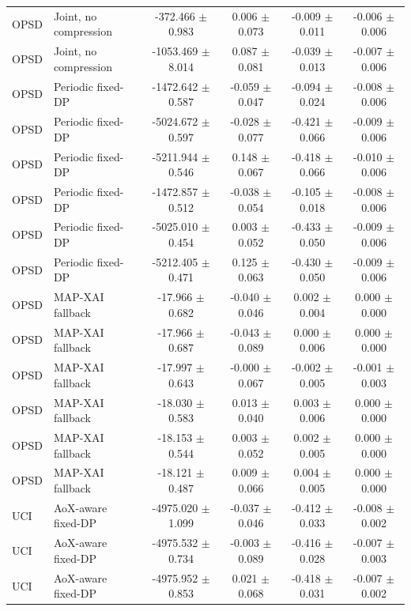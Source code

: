 \begin{tabular}{llcccc}
OPSD & Joint, no compression & -372.466 $\pm$ 0.983 & 0.006 $\pm$ 0.073 & -0.009 $\pm$ 0.011 & -0.006 $\pm$ 0.006 \\
OPSD & Joint, no compression & -1053.469 $\pm$ 8.014 & 0.087 $\pm$ 0.081 & -0.039 $\pm$ 0.013 & -0.007 $\pm$ 0.006 \\
OPSD & Periodic fixed-DP & -1472.642 $\pm$ 0.587 & -0.059 $\pm$ 0.047 & -0.094 $\pm$ 0.024 & -0.008 $\pm$ 0.006 \\
OPSD & Periodic fixed-DP & -5024.672 $\pm$ 0.597 & -0.028 $\pm$ 0.077 & -0.421 $\pm$ 0.066 & -0.009 $\pm$ 0.006 \\
OPSD & Periodic fixed-DP & -5211.944 $\pm$ 0.546 & 0.148 $\pm$ 0.067 & -0.418 $\pm$ 0.066 & -0.010 $\pm$ 0.006 \\
OPSD & Periodic fixed-DP & -1472.857 $\pm$ 0.512 & -0.038 $\pm$ 0.054 & -0.105 $\pm$ 0.018 & -0.008 $\pm$ 0.006 \\
OPSD & Periodic fixed-DP & -5025.010 $\pm$ 0.454 & 0.003 $\pm$ 0.052 & -0.433 $\pm$ 0.050 & -0.009 $\pm$ 0.006 \\
OPSD & Periodic fixed-DP & -5212.405 $\pm$ 0.471 & 0.125 $\pm$ 0.063 & -0.430 $\pm$ 0.050 & -0.009 $\pm$ 0.006 \\
OPSD & MAP-XAI fallback & -17.966 $\pm$ 0.682 & -0.040 $\pm$ 0.046 & 0.002 $\pm$ 0.004 & 0.000 $\pm$ 0.000 \\
OPSD & MAP-XAI fallback & -17.966 $\pm$ 0.687 & -0.043 $\pm$ 0.089 & 0.000 $\pm$ 0.006 & 0.000 $\pm$ 0.000 \\
OPSD & MAP-XAI fallback & -17.997 $\pm$ 0.643 & -0.000 $\pm$ 0.067 & -0.002 $\pm$ 0.005 & -0.001 $\pm$ 0.003 \\
OPSD & MAP-XAI fallback & -18.030 $\pm$ 0.583 & 0.013 $\pm$ 0.040 & 0.003 $\pm$ 0.006 & 0.000 $\pm$ 0.000 \\
OPSD & MAP-XAI fallback & -18.153 $\pm$ 0.544 & 0.003 $\pm$ 0.052 & 0.002 $\pm$ 0.005 & 0.000 $\pm$ 0.000 \\
OPSD & MAP-XAI fallback & -18.121 $\pm$ 0.487 & 0.009 $\pm$ 0.066 & 0.004 $\pm$ 0.005 & 0.000 $\pm$ 0.000 \\
UCI & AoX-aware fixed-DP & -4975.020 $\pm$ 1.099 & -0.037 $\pm$ 0.046 & -0.412 $\pm$ 0.033 & -0.008 $\pm$ 0.002 \\
UCI & AoX-aware fixed-DP & -4975.532 $\pm$ 0.734 & -0.003 $\pm$ 0.089 & -0.416 $\pm$ 0.028 & -0.007 $\pm$ 0.003 \\
UCI & AoX-aware fixed-DP & -4975.952 $\pm$ 0.853 & 0.021 $\pm$ 0.068 & -0.418 $\pm$ 0.031 & -0.007 $\pm$ 0.002 \\

\end{tabular}
